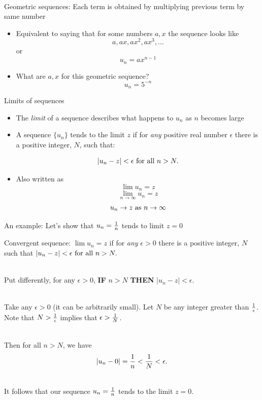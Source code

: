 \documentclass[10pt]{seminar}
\begin{document}
\begin{slide}
\ \\Geometric sequences: Each term is obtained by multiplying previous term by same number

\begin{itemize}
\item Equivalent to saying that for some numbers $a, x$ the sequence looks like $$a, ax, ax^2, ax^3, ...$$ or $$u_n=ax^{n-1}$$

\item What are $a, x$ for this geometric sequence? $$u_n=5^{-n}$$ %
\end{itemize}

\newslide
Limits of sequences

\begin{itemize}
\item The \textit{limit} of a sequence describes what happens to $u_n$ as $n$ becomes large

\item A sequence $\{u_n\}$ tends to the limit $z$ if for \textit{any} positive real number $\epsilon$ there is a positive integer, $N$, such that:

$$|u_n-z|<\epsilon \hbox{ for all }n>N.$$

\item Also written as  $$\lim u_n=z$$ $$\lim_{n\rightarrow \infty}u_n=z$$ $$u_n\rightarrow z \hbox{ as } n\rightarrow \infty$$

\end{itemize}

\newslide An example: Let's show that $u_n={1\over n}$ tends to limit $z=0$

Convergent sequence:  $\lim u_n=z$ if for \textit{any}  $\epsilon>0$ there is a positive integer, $N$ such that $|u_n-z|<\epsilon \hbox{ for all }n>N.$

\ \\Put differently, for any $\epsilon>0$, \textbf{IF} $n>N$ \textbf{THEN} $|u_n-z|<\epsilon$.

\ \\Take any $\epsilon>0$ (it can be arbitrarily small).  Let $N $ be any integer greater than ${1\over \epsilon}$.  Note that $N>{1\over \epsilon}$ implies that $\epsilon>{1\over N}$.

\ \\ Then for all $n>N$, we have $$|u_n-0|={1\over n}<{1\over N}<\epsilon.$$

\ \\It follows that our sequence $u_n={1\over n}$ tends to the limit $z=0$.


\end{slide}
\end{document}
